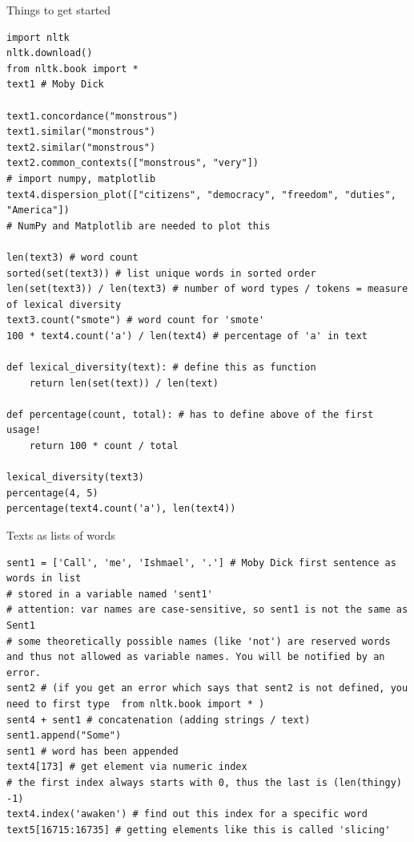 \documentclass[10pt]{beamer}
\begin{document}
\begin{frame}{Things to get started} 
\begin{verbatim}
import nltk
nltk.download()
from nltk.book import *
text1 # Moby Dick

text1.concordance("monstrous")
text1.similar("monstrous")
text2.similar("monstrous")
text2.common_contexts(["monstrous", "very"])
# import numpy, matplotlib
text4.dispersion_plot(["citizens", "democracy", "freedom", "duties", "America"])
# NumPy and Matplotlib are needed to plot this

len(text3) # word count
sorted(set(text3)) # list unique words in sorted order
len(set(text3)) / len(text3) # number of word types / tokens = measure of lexical diversity
text3.count("smote") # word count for 'smote'
100 * text4.count('a') / len(text4) # percentage of 'a' in text

def lexical_diversity(text): # define this as function
    return len(set(text)) / len(text)
    
def percentage(count, total): # has to define above of the first usage!
    return 100 * count / total

lexical_diversity(text3)
percentage(4, 5)
percentage(text4.count('a'), len(text4))
\end{verbatim}
\end{frame}

\begin{frame}{Texts as lists of words} 
\begin{verbatim}
sent1 = ['Call', 'me', 'Ishmael', '.'] # Moby Dick first sentence as words in list
# stored in a variable named 'sent1' 
# attention: var names are case-sensitive, so sent1 is not the same as Sent1
# some theoretically possible names (like 'not') are reserved words and thus not allowed as variable names. You will be notified by an error.
sent2 # (if you get an error which says that sent2 is not defined, you need to first type  from nltk.book import * ) 
sent4 + sent1 # concatenation (adding strings / text)
sent1.append("Some")
sent1 # word has been appended
text4[173] # get element via numeric index
# the first index always starts with 0, thus the last is (len(thingy) -1) 
text4.index('awaken') # find out this index for a specific word
text5[16715:16735] # getting elements like this is called 'slicing'
\end{verbatim}
\end{frame}
\end{document}
